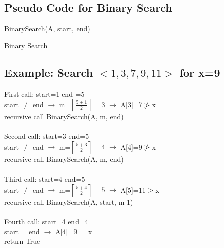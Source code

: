 \documentclass[12pt,letterpaper]{article}
\begin{document}
\subsection{Pseudo Code for Binary Search}
\begin{algorithm}[h]
BinarySearch(A, start, end)

\caption{Binary Search}
\label{Binary Search}
\end{algorithm}
\FloatBarrier
\subsection{Example: Search $<1,3,7,9,11>$ for x=9}
First call: start=1 end =5\\
start $\ne$ end $\to$ m=$\left \lceil\frac{5+1}{2}\right\rceil=3$ $\to$ A[3]=7$\ngtr$x \\recursive call BinarySearch(A, m, end)\\ \\
Second call: start=3 end=5\\
start $\ne$ end $\to$ m=$\left \lceil\frac{5+3}{2}\right\rceil=4$ $\to$ A[4]=9$\ngtr$x \\recursive call BinarySearch(A, m, end)\\ \\
Third call: start=4 end=5\\
start $\ne$ end $\to$ m=$\left \lceil\frac{5+4}{2}\right\rceil=5$ $\to$ A[5]=11$>$x \\recursive call BinarySearch(A, start, m-1)\\ \\
Fourth call: start=4 end=4\\
start = end $\to$ A[4]=9==x \\return True\\ \\
\end{document}
